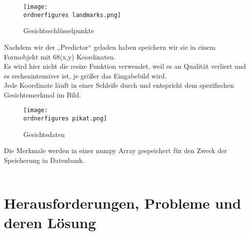 \begin{figure}[H]
	\texttt{[image: \\ordnerfigures landmarks.png]}
	\centering
	\caption{Gesichtsschlüsselpunkte \cite{Kazemi2014OneMF}}
	\label{fig:landmarks}
\end{figure}
\justify
Nachdem wir der „Predictor“ geladen haben speichern wir sie in einem Formobjekt mit 68(x,y) Koordinaten. \\
Es wird hier nicht die resize Funktion verwendet, weil es an Qualität verliert und es rechenintensiver ist, je größer das Eingabebild wird. \\
Jede Koordinate läuft in einer Schleife durch und entspricht dem spezifischen Gesichtsmerkmal im Bild.  \\
\begin{figure}[H]
	\texttt{[image: \\ordnerfigures pikat.png]}
	\centering
	\caption{Gesichtsdaten}
\end{figure}


Die Merkmale werden in einer numpy Array gespeichert für den Zweck der Speicherung in Datenbank. \\\\


\section{Herausforderungen, Probleme und deren Lösung }

